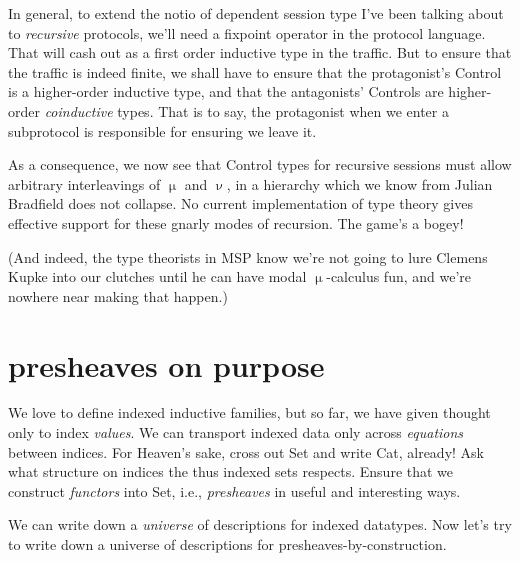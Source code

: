 \documentclass{book}
\begin{document}
In general, to extend the notio of dependent session type I've been talking about to \emph{recursive} protocols, we'll need a fixpoint operator in the protocol language. That will cash out as a first order inductive type in the traffic. But to ensure that the traffic is indeed finite, we shall have to ensure that the protagonist's Control is a higher-order inductive type, and that the antagonists' Controls are higher-order \emph{coinductive} types. That is to say, the protagonist when we enter a subprotocol is responsible for ensuring we leave it.

As a consequence, we now see that Control types for recursive sessions must allow arbitrary interleavings of $\upmu$ and $\upnu$, in a hierarchy which we know from Julian Bradfield does not collapse. No current implementation of type theory gives effective support for these gnarly modes of recursion. The game's a bogey!

(And indeed, the type theorists in MSP know we're not going to lure Clemens Kupke into our clutches until he can have modal $\upmu$-calculus fun, and we're nowhere near making that happen.)


\chapter{\label{chapter:presheaves}presheaves on purpose}

We love to define indexed inductive families, but so far, we have given thought only to index \emph{values}. We can transport indexed data only across \emph{equations} between indices. For Heaven's sake, cross out Set and write Cat, already! Ask what structure on indices the thus indexed sets respects. Ensure that we construct \emph{functors} into Set, i.e., \emph{presheaves} in useful and interesting ways.

We can write down a \emph{universe} of descriptions for indexed datatypes. Now let's try to write down a universe of descriptions for presheaves-by-construction.
\end{document}
